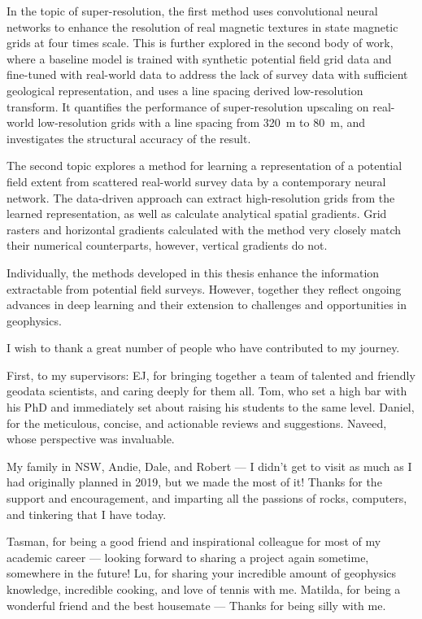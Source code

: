 \documentclass[12pt,a4paper,notitlepage]{report} %
\begin{document}
In the topic of super-resolution, the first method uses convolutional neural networks to enhance the resolution of real magnetic textures in state magnetic grids at four times scale.
This is further explored in the second body of work, where a baseline model is trained with synthetic potential field grid data and fine-tuned with real-world data to address the lack of survey data with sufficient geological representation, and uses a line spacing derived low-resolution transform.
It quantifies the performance of super-resolution upscaling on real-world low-resolution grids with a line spacing from \SI{320}{\m} to \SI{80}{\m}, and investigates the structural accuracy of the result.

The second topic explores a method for learning a representation of a potential field extent from scattered real-world survey data by a contemporary neural network.
The data-driven approach can extract high-resolution grids from the learned representation, as well as calculate analytical spatial gradients.
Grid rasters and horizontal gradients calculated with the method very closely match their numerical counterparts, however, vertical gradients do not.

Individually, the methods developed in this thesis enhance the information extractable from potential field surveys.
However, together they reflect ongoing advances in deep learning and their extension to challenges and opportunities in geophysics.

\newpage{}

I wish to thank a great number of people who have contributed to my journey.

First, to my supervisors:
EJ, for bringing together a team of talented and friendly geodata scientists, and caring deeply for them all.
Tom, who set a high bar with his PhD and immediately set about raising his students to the same level.
Daniel, for the meticulous, concise, and actionable reviews and suggestions.
Naveed, whose perspective was invaluable.

My family in NSW, Andie, Dale, and Robert --- I didn't get to visit as much as I had originally planned in 2019, but we made the most of it! Thanks for the support and encouragement, and imparting all the passions of rocks, computers, and tinkering that I have today.

Tasman, for being a good friend and inspirational colleague for most of my academic career --- looking forward to sharing a project again sometime, somewhere in the future!
Lu, for sharing your incredible amount of geophysics knowledge, incredible cooking, and love of tennis with me.
Matilda, for being a wonderful friend and the best housemate --- Thanks for being silly with me.
\end{document}
